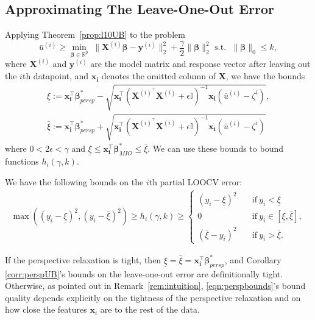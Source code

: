 \documentclass[opre,nonblindrev]{informs3} %
\begin{document}
\subsection{Approximating The Leave-One-Out Error}\label{sec:genBounds}
Applying Theorem~\ref{prop:l10UB} to the problem 
$$	\bar u^{(i)}\geq \min_{\bm{\beta}\in \mathbb{R}^p}\; \|\bm{X}^{(i)}\bm{\beta}-\bm{y}^{(i)}\|_2^2+\frac{\gamma}{2}\|\bm{\beta}\|_2^2
\text{ s.t. }\; \|\bm{\beta}\|_0\leq k,$$ where $\bm{X}^{(i)}$ and $\bm{y}^{(i)}$ are the model matrix and response vector after leaving out the $i$th datapoint, and $\bm{x_i}$ denotes the omitted column of $\bm{X}$, we have the bounds
\begin{align*}
	\underline{\xi}:=\bm{x_i^\top}\bm{\beta}_{persp}^*-\sqrt{\bm{x_i^\top}\left(\bm{X}^{(i)^\top} \bm{X}^{(i)}+\epsilon\mathbb{I}\right)^{-1}\bm{x_i}\left(\bar u^{(i)}-\zeta^{i}\right)},\\
	\bar{\xi}:=\bm{x_i^\top}\bm{\beta}_{persp}^*+\sqrt{\bm{x_i^\top}\left(\bm{X}^{(i)^\top} \bm{X}^{(i)}+\epsilon\mathbb{I}\right)^{-1}\bm{x_i}\left(\bar u^{(i)}-\zeta^{i}\right)}
\end{align*}
where $0 < 2\epsilon < \gamma$ and $\underline{\xi}\leq \bm{x_i^\top}\bm{\beta}_{MIO}^*\leq \bar\xi$. We can use these bounds to bound functions $h_i(\gamma,k)$.
\begin{corollary}\label{corr:perspUB}
	We have the following bounds on the $i$th partial LOOCV error:
	\begin{align}\label{eqn:perspbounds}
		\max\left((y_i-\underline{\xi})^2, (y_i-\bar{\xi})^2\right) \geq h_i(\gamma, k) \geq \begin{cases} (y_i-\underline{\xi})^2 \quad & \text{if} \ y_i < \underline{\xi}\\
			0 \quad & \text{if} \ y_i \in [\underline{\xi}, \bar{\xi}],\\
			(\bar{\xi}-y_i)^2 \quad & \text{if} \ y_i > \bar{\xi}.
		\end{cases}
	\end{align}
\end{corollary}

\begin{remark}
If the perspective relaxation is tight, then 	$\underline{\xi}=\bar{\xi}=\bm{x_i^\top}\bm{\beta}_{persp}^*$, and Corollary \ref{corr:perspUB}'s bounds on the leave-one-out error are definitionally tight. Otherwise, as pointed out in Remark~\ref{rem:intuition}, \eqref{eqn:perspbounds}'s bound quality depends explicitly on the tightness of the perspective relaxation and on how close the features $\bm{x}_i$ are to the rest of the data. 
\end{remark}
\end{document}
